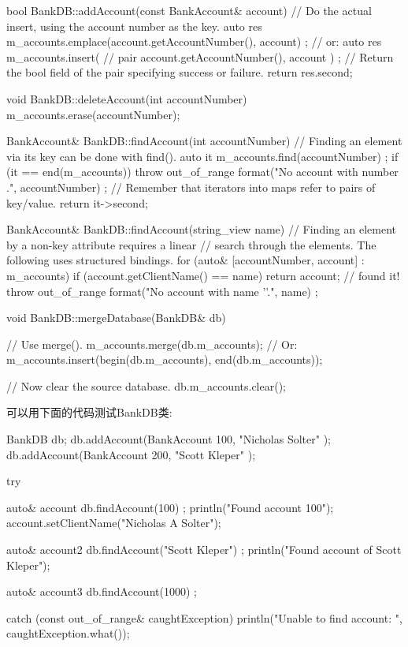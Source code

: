 \begin{cpp}
bool BankDB::addAccount(const BankAccount& account)
{
    // Do the actual insert, using the account number as the key.
    auto res { m_accounts.emplace(account.getAccountNumber(), account) };
    // or: auto res { m_accounts.insert(
        // pair { account.getAccountNumber(), account }) };
    // Return the bool field of the pair specifying success or failure.
    return res.second;
}

void BankDB::deleteAccount(int accountNumber)
{
    m_accounts.erase(accountNumber);
}

BankAccount& BankDB::findAccount(int accountNumber)
{
    // Finding an element via its key can be done with find().
    auto it { m_accounts.find(accountNumber) };
    if (it == end(m_accounts)) {
        throw out_of_range { format("No account with number {}.", accountNumber) };
    }
    // Remember that iterators into maps refer to pairs of key/value.
    return it->second;
}

BankAccount& BankDB::findAccount(string_view name)
{
    // Finding an element by a non-key attribute requires a linear
    // search through the elements. The following uses structured bindings.
    for (auto& [accountNumber, account] : m_accounts) {
        if (account.getClientName() == name) {
            return account; // found it!
        }
    }
    throw out_of_range { format("No account with name '{}'.", name) };
}

void BankDB::mergeDatabase(BankDB& db)
{
    // Use merge().
    m_accounts.merge(db.m_accounts);
    // Or: m_accounts.insert(begin(db.m_accounts), end(db.m_accounts));

    // Now clear the source database.
    db.m_accounts.clear();
}
\end{cpp}

可以用下面的代码测试BankDB类:

\begin{cpp}
BankDB db;
db.addAccount(BankAccount { 100, "Nicholas Solter" });
db.addAccount(BankAccount { 200, "Scott Kleper" });

try {
    auto& account { db.findAccount(100) };
    println("Found account 100");
    account.setClientName("Nicholas A Solter");

    auto& account2 { db.findAccount("Scott Kleper") };
    println("Found account of Scott Kleper");

    auto& account3 { db.findAccount(1000) };
} catch (const out_of_range& caughtException) {
    println("Unable to find account: {}", caughtException.what());
}
\end{cpp}

